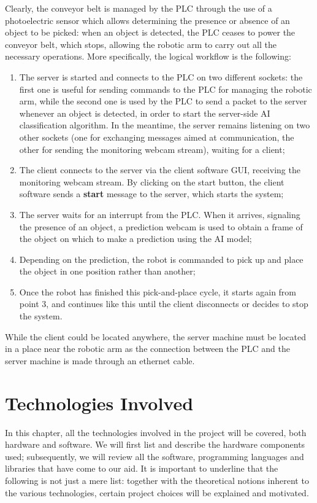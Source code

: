 \documentclass[a4paper,11pt]{report}
\theoremstyle{definition}
\theoremstyle{plain}
\begin{document}
        Clearly, the conveyor belt is managed by the PLC through the use of a photoelectric sensor which allows determining the presence or absence of an object to be picked: when an object is detected, the PLC ceases to power the conveyor belt, which stops, allowing the robotic arm to carry out all the necessary operations. More specifically, the logical workflow is the following:
        \begin{enumerate}
            \item The server is started and connects to the PLC on two different sockets: the first one is useful for sending commands to the PLC for managing the robotic arm, while the second one is used by the PLC to send a packet to the server whenever an object is detected, in order to start the server-side AI classification algorithm. In the meantime, the server remains listening on two other sockets (one for exchanging messages aimed at communication, the other for sending the monitoring webcam stream), waiting for a client;
            \item The client connects to the server via the client software GUI, receiving the monitoring webcam stream. By clicking on the start button, the client software sends a \textbf{start} message to the server, which starts the system;
            \item The server waits for an interrupt from the PLC. When it arrives, signaling the presence of an object, a prediction webcam is used to obtain a frame of the object on which to make a prediction using the AI model;
            \item Depending on the prediction, the robot is commanded to pick up and place the object in one position rather than another;
            \item Once the robot has finished this pick-and-place cycle, it starts again from point 3, and continues like this until the client disconnects or decides to stop the system.
        \end{enumerate}

    While the client could be located anywhere, the server machine must be located in a place near the robotic arm as the connection between the PLC and the server machine is made through an ethernet cable.


\chapter{Technologies Involved}
    In this chapter, all the technologies involved in the project will be covered, both hardware and software. We will first list and describe the hardware components used; subsequently, we will review all the software, programming languages and libraries that have come to our aid. It is important to underline that the following is not just a mere list: together with the theoretical notions inherent to the various technologies, certain project choices will be explained and motivated.
\end{document}
